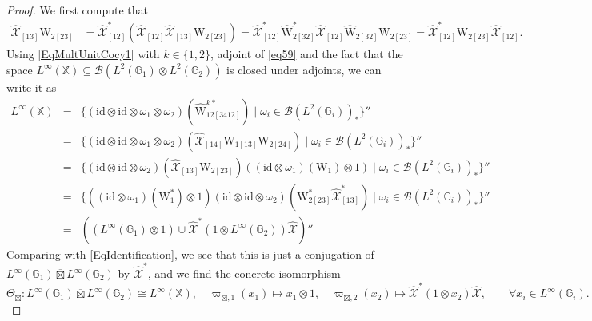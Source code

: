 \documentclass[reqno]{amsart}
\numberwithin{equation}{section}
\newcommand{\mcB}{\mathcal{B}}
\newcommand{\id}{\mathrm{id}}
\newcommand{\G}{\mathbb{G}}
\newcommand{\X}{\mathbb{X}}
\newcommand{\mcX}{\mathcal{X}}
\newcommand{\ov}{\overline}
\newcommand{\wh}{\widehat}
\newcommand{\ww}{\mathrm{W}}
\begin{document}
\begin{proof}
We first compute that 
\begin{equation}\begin{split}\label{eq59}
\wh{\mcX}_{[13]}\ww_{2[23]}
&= \wh{\mcX}_{[12]}^*(\wh{\mcX}_{[12]} \wh{\mcX}_{[13]}\ww_{2[23]})=
 \wh{\mcX}_{[12]}^*\hat{\ww}_{2[32]}^*\wh{\mcX}_{[12]}\hat{\ww}_{2[32]}\ww_{2[23]}
= \wh{\mcX}_{[12]}^* \ww_{2[23]}\wh{\mcX}_{[12]}.
\end{split}\end{equation}
Using \eqref{EqMultUnitCocy1} with $k\in\{1,2\}$, adjoint of \eqref{eq59} and the fact that the space $L^{\infty}(\X)\subseteq \mcB(L^2(\G_1)\otimes L^2(\G_2))$ is closed under adjoints, we can write it as
\begin{eqnarray*}
L^{\infty}(\X) &=& 
\{(\id\otimes \id \otimes \omega_1\otimes \omega_2)
( \hat{\ww}^{k *}_{12 [3412]}) \mid \omega_i \in \mcB(L^2(\G_i))_*\}'' \\
& = &
\{(\id\otimes \id \otimes \omega_1\otimes \omega_2)(\wh{\mcX}_{[14]}\ww_{1[13]}\ww_{2[24]}) \mid \omega_i \in \mcB(L^2(\G_i))_*\}'' \\
&=&  \{(\id\otimes \id\otimes \omega_2)(\wh{\mcX}_{[13]}\ww_{2[23]}) ((\id\otimes \omega_1)(\ww_1)\otimes 1) \mid \omega_i \in \mcB(L^2(\G_i))_*\}''\\
&=&  \{ ((\id\otimes \omega_1)(\ww_1^*)\otimes 1)(\id\otimes \id\otimes \omega_2)(\ww_{2[23]}^*\wh{\mcX}_{[13]}^*) \mid \omega_i \in \mcB(L^2(\G_i))_*\}''\\
&=& ((L^{\infty}(\G_1)\otimes1) \cup \wh{\mcX}^*(1\otimes L^{\infty}(\G_2))\wh{\mcX})''
\end{eqnarray*}
Comparing with \eqref{EqIdentification}, we see that this is just a conjugation of $L^{\infty}(\G_1)\ov{\boxtimes} L^{\infty}(\G_2)$ by $\wh{\mcX}^*$, and we find the concrete isomorphism
\[
\Theta_{\boxtimes}\colon L^{\infty}(\G_1)\ov{\boxtimes} L^{\infty}(\G_2) \cong L^{\infty}(\X),\quad \varpi_{\boxtimes,1}(x_1) \mapsto x_1\otimes 1,\quad \varpi_{\boxtimes,2}(x_2)\mapsto \wh{\mcX}^*(1\otimes x_2)\wh{\mcX},\qquad \forall x_i \in L^{\infty}(\G_i). 
\]


\end{proof}
\end{document}
